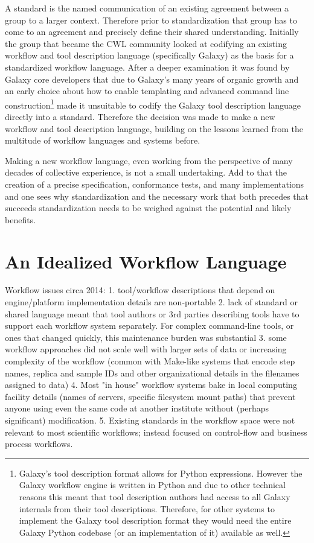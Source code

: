 A standard is the named communication of an existing agreement between a group to a larger context. Therefore prior to standardization that group has to come to an agreement and precisely define their shared understanding. Initially the group that became the CWL community looked at codifying an existing workflow and tool description language (specifically Galaxy) as the basis for a standardized workflow language. After a deeper examination it was found by Galaxy core developers that due to Galaxy’s many years of organic growth and an early choice about how to enable templating and advanced command line construction\footnote{Galaxy’s tool description format allows for Python expressions. However the Galaxy workflow engine is written in Python and due to other technical reasons this meant that tool description authors had access to all Galaxy internals from their tool descriptions. Therefore, for other systems to implement the Galaxy tool description format they would need the entire Galaxy Python codebase (or an implementation of it) available as well.} made it unsuitable to codify the Galaxy tool description language directly into a standard. Therefore the decision was made to make a new workflow and tool description language, building on the lessons learned from the multitude of workflow languages and systems before.

Making a new workflow language, even working from the perspective of many decades of collective experience, is not a small undertaking. Add to that the creation of a precise specification, conformance tests, and many implementations and one sees why standardization and the necessary work that both precedes that succeeds standardization needs to be weighed against the potential and likely benefits.

\section{An Idealized Workflow Language}

Workflow issues circa 2014: 
1. tool/workflow descriptions that depend on engine/platform implementation details are non-portable
2. lack of standard or shared language meant that tool authors or 3rd parties describing tools have to support each workflow system separately. For complex command-line tools, or ones that changed quickly, this maintenance burden was substantial
3. some workflow approaches did not scale well with larger sets of data or increasing complexity of the workflow (common with Make-like systems that encode step names, replica and sample IDs and other organizational details in the filenames assigned to data)
4. Most "in house" workflow systems bake in local computing facility details (names of servers, specific filesystem mount paths) that prevent anyone using even the same code at another institute without (perhaps significant) modification.
5. Existing standards in the workflow space were not relevant to most scientific workflows; instead focused on control-flow and business process workflows.

